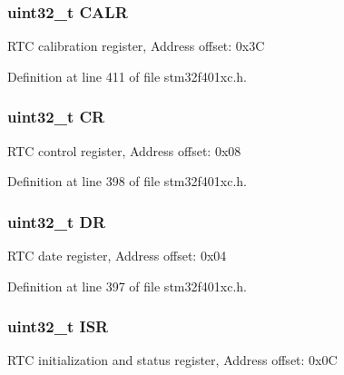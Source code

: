 \subsubsection[{\texorpdfstring{C\+A\+LR}{CALR}}]{ uint32\+\_\+t C\+A\+LR}\hypertarget{struct_r_t_c___type_def_a2ce7c3842792c506635bb87a21588b58}{}\label{struct_r_t_c___type_def_a2ce7c3842792c506635bb87a21588b58}
R\+TC calibration register, Address offset\+: 0x3C 

Definition at line 411 of file stm32f401xc.\+h.

\subsubsection[{\texorpdfstring{CR}{CR}}]{ uint32\+\_\+t CR}\hypertarget{struct_r_t_c___type_def_ab40c89c59391aaa9d9a8ec011dd0907a}{}\label{struct_r_t_c___type_def_ab40c89c59391aaa9d9a8ec011dd0907a}
R\+TC control register, Address offset\+: 0x08 

Definition at line 398 of file stm32f401xc.\+h.

\subsubsection[{\texorpdfstring{DR}{DR}}]{ uint32\+\_\+t DR}\hypertarget{struct_r_t_c___type_def_a3df0d8dfcd1ec958659ffe21eb64fa94}{}\label{struct_r_t_c___type_def_a3df0d8dfcd1ec958659ffe21eb64fa94}
R\+TC date register, Address offset\+: 0x04 

Definition at line 397 of file stm32f401xc.\+h.

\subsubsection[{\texorpdfstring{I\+SR}{ISR}}]{ uint32\+\_\+t I\+SR}\hypertarget{struct_r_t_c___type_def_ab3c49a96815fcbee63d95e1e74f20e75}{}\label{struct_r_t_c___type_def_ab3c49a96815fcbee63d95e1e74f20e75}
R\+TC initialization and status register, Address offset\+: 0x0C 

